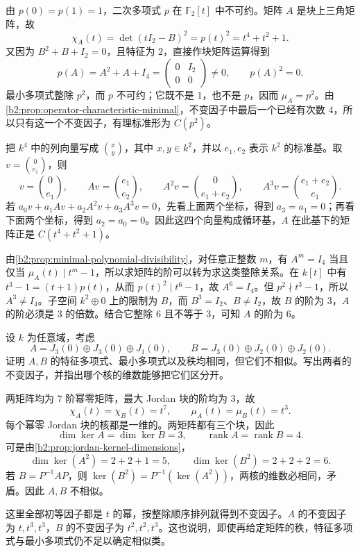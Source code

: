 \begin{solution}
	由 \(p(0)=p(1)=1\)，二次多项式 \(p\) 在 \(\mathbb F_2[t]\) 中不可约。矩阵 \(A\) 是块上三角矩阵，故
	\[
		\chi_A(t)=\det(tI_2-B)^2=p(t)^2=t^4+t^2+1.
	\]
	又因为 \(B^2+B+I_2=0\)，且特征为 \(2\)，直接作块矩阵运算得到
	\[
		p(A)=A^2+A+I_4=\begin{pmatrix}0&I_2\\0&0\end{pmatrix}\ne0,
		\qquad p(A)^2=0.
	\]
	最小多项式整除 \(p^2\)，而 \(p\) 不可约；它既不是 \(1\)，也不是 \(p\)，因而 \(\mu_A=p^2\)。由\cref{b2:prop:operator-characteristic-minimal}，不变因子中最后一个已经有次数 \(4\)，所以只有这一个不变因子，有理标准形为 \(C(p^2)\)。

	把 \(k^4\) 中的列向量写成 \(\binom{x}{y}\)，其中 \(x,y\in k^2\)，并以 \(e_1,e_2\) 表示 \(k^2\) 的标准基。取 \(v=\binom{0}{e_1}\)，则
	\[
		v=\binom{0}{e_1},\qquad Av=\binom{e_1}{e_2},\qquad A^2v=\binom{0}{e_1+e_2},\qquad A^3v=\binom{e_1+e_2}{e_1}.
	\]
	若 \(a_0v+a_1Av+a_2A^2v+a_3A^3v=0\)，先看上面两个坐标，得到 \(a_3=a_1=0\)；再看下面两个坐标，得到 \(a_2=a_0=0\)。因此这四个向量构成循环基，\(A\) 在此基下的矩阵正是 \(C(t^4+t^2+1)\)。

	由\cref{b2:prop:minimal-polynomial-divisibility}，对任意正整数 \(m\)，有 \(A^m=I_4\) 当且仅当 \(\mu_A(t)\mid t^m-1\)，所以求矩阵的阶可以转为求这类整除关系。在 \(k[t]\) 中有 \(t^3-1=(t+1)p(t)\)，从而 \(p(t)^2\mid t^6-1\)，故 \(A^6=I_4\)。但 \(p^2\nmid t^3-1\)，所以 \(A^3\ne I_4\)。子空间 \(k^2\oplus0\) 上的限制为 \(B\)，而 \(B^3=I_2\)、\(B\ne I_2\)，故 \(B\) 的阶为 \(3\)，\(A\) 的阶必须是 \(3\) 的倍数。结合它整除 \(6\) 且不等于 \(3\)，可知 \(A\) 的阶为 \(6\)。
\end{solution}

\begin{exercise}
	\label{b2:ex:04-same-polynomials-rank}
	设 \(k\) 为任意域，考虑
	\[
		A=J_3(0)\oplus J_3(0)\oplus J_1(0),\qquad B=J_3(0)\oplus J_2(0)\oplus J_2(0).
	\]
	证明 \(A,B\) 的特征多项式、最小多项式以及秩均相同，但它们不相似。写出两者的不变因子，并指出哪个核的维数能够把它们区分开。
\end{exercise}

\begin{solution}
	两矩阵均为 \(7\) 阶幂零矩阵，最大 Jordan 块的阶均为 \(3\)，故
	\[
		\chi_A(t)=\chi_B(t)=t^7,\qquad \mu_A(t)=\mu_B(t)=t^3.
	\]
	每个幂零 Jordan 块的核都是一维的。两矩阵都有三个块，因此
	\[
		\dim\ker A=\dim\ker B=3,\qquad \operatorname{rank}A=\operatorname{rank}B=4.
	\]
	可是由\cref{b2:prop:jordan-kernel-dimensions}，
	\[
		\dim\ker(A^2)=2+2+1=5,\qquad \dim\ker(B^2)=2+2+2=6.
	\]
	若 \(B=P^{-1}AP\)，则 \(\ker(B^2)=P^{-1}(\ker(A^2))\)，两核的维数必相同，矛盾。因此 \(A,B\) 不相似。

	这里全部初等因子都是 \(t\) 的幂，按整除顺序排列就得到不变因子。\(A\) 的不变因子为 \(t,t^3,t^3\)，\(B\) 的不变因子为 \(t^2,t^2,t^3\)。这也说明，即使再给定矩阵的秩，特征多项式与最小多项式仍不足以确定相似类。
\end{solution}

